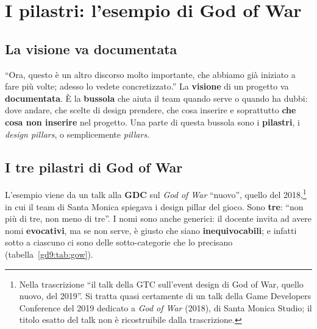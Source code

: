 \section{I pilastri: l'esempio di God of War}
\label{gd9:sec:pilastri}



\subsection{La visione va documentata}

``Ora, questo è un altro discorso molto importante, che abbiamo già iniziato
a fare più volte; adesso lo vedete concretizzato.'' La \textbf{visione} di un
progetto va \textbf{documentata}. È la \textbf{bussola} che aiuta il team
quando serve o quando ha dubbi: dove andare, che scelte di design prendere,
che cosa inserire e soprattutto \textbf{che cosa non inserire} nel progetto.
Una parte di questa bussola sono i \textbf{pilastri}, i \emph{design
pillars}, o semplicemente \emph{pillars}.

\subsection{I tre pilastri di God of War}

L'esempio viene da un talk alla \textbf{GDC} sul \emph{God of War}
``nuovo'', quello del 2018,\footnote{Nella trascrizione ``il talk della GTC
sull'event design di God of War, quello nuovo, del 2019''. Si tratta quasi
certamente di un talk della Game Developers Conference del 2019 dedicato a
\emph{God of War} (2018), di Santa Monica Studio; il titolo esatto del talk
non è ricostruibile dalla trascrizione.} in cui il team di Santa Monica
spiegava i design pillar del gioco. Sono \textbf{tre}: ``non più di tre, non
meno di tre''. I nomi sono anche generici: il docente invita ad avere nomi
\textbf{evocativi}, ma se non serve, è giusto che siano
\textbf{inequivocabili}; e infatti sotto a ciascuno ci sono delle
sotto-categorie che lo precisano (tabella~\ref{gd9:tab:gow}).

